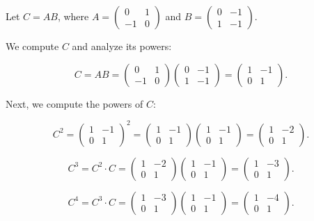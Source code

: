 \documentclass[12pt]{amsart}
\theoremstyle{definition}
\numberwithin{equation}{section}
\begin{document}
\begin{exercise}{5}
    Let \(C = AB\), where \(A = \begin{pmatrix} 0 & 1 \\ -1 & 0 \end{pmatrix}\) and \(B = \begin{pmatrix} 0 & -1 \\ 1 & -1 \end{pmatrix}\).
    
    We compute \(C\) and analyze its powers:
    
    \[
    C = AB = \begin{pmatrix} 0 & 1 \\ -1 & 0 \end{pmatrix} \begin{pmatrix} 0 & -1 \\ 1 & -1 \end{pmatrix} = \begin{pmatrix} 1 & -1 \\ 0 & 1 \end{pmatrix}.
    \]
    
    Next, we compute the powers of \(C\):
    
    \[
    C^2 = \begin{pmatrix} 1 & -1 \\ 0 & 1 \end{pmatrix}^2 = \begin{pmatrix} 1 & -1 \\ 0 & 1 \end{pmatrix} \begin{pmatrix} 1 & -1 \\ 0 & 1 \end{pmatrix} = \begin{pmatrix} 1 & -2 \\ 0 & 1 \end{pmatrix}.
    \]
    
    \[
    C^3 = C^2 \cdot C = \begin{pmatrix} 1 & -2 \\ 0 & 1 \end{pmatrix} \begin{pmatrix} 1 & -1 \\ 0 & 1 \end{pmatrix} = \begin{pmatrix} 1 & -3 \\ 0 & 1 \end{pmatrix}.
    \]
    
    \[
    C^4 = C^3 \cdot C = \begin{pmatrix} 1 & -3 \\ 0 & 1 \end{pmatrix} \begin{pmatrix} 1 & -1 \\ 0 & 1 \end{pmatrix} = \begin{pmatrix} 1 & -4 \\ 0 & 1 \end{pmatrix}.
    \]
    

\end{exercise}
\end{document}
